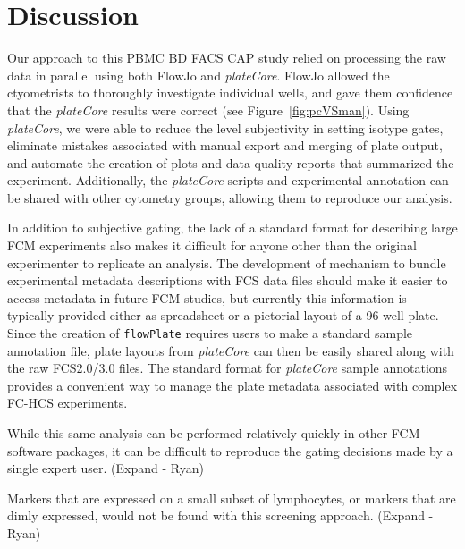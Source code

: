 \documentclass[12pt]{article}
\newcommand{\Robject}[1]{{\texttt{#1}}}
\newcommand{\Rpackage}[1]{{\textit{#1}}}
\begin{document}
\clearpage
\section*{Discussion}

Our approach to this PBMC BD FACS CAP study relied on processing the raw data
in parallel using both FlowJo and \Rpackage{plateCore}. FlowJo
allowed the ctyometrists to thoroughly investigate individual wells, and gave them confidence
that the \Rpackage{plateCore} results were correct (see Figure~\ref{fig:pcVSman}). Using
\Rpackage{plateCore}, we were able to reduce the level subjectivity in setting isotype gates,
eliminate mistakes associated with manual export and merging of plate output,
and automate the creation of plots and data quality reports that summarized the experiment. 
Additionally, the \Rpackage{plateCore} scripts and experimental annotation can
be shared with other cytometry groups, allowing them to reproduce our analysis. 

In addition to subjective gating, the lack of a standard format for describing large FCM experiments also
makes it difficult for anyone other than the original experimenter to replicate an analysis. %
The development of mechanism to bundle experimental metadata descriptions with FCS data files should make it easier to access metadata in future FCM studies, but currently
this information is typically provided either as spreadsheet or a pictorial layout of a 96 well plate. 
Since the creation of \Robject{flowPlate} requires users to make a standard sample annotation file, plate layouts from \Rpackage{plateCore}
can then be easily shared along with the raw FCS2.0/3.0 files. 
The standard format for \Rpackage{plateCore} sample annotations provides a convenient way to manage the plate metadata
associated with complex FC-HCS experiments.

While this same analysis can be performed relatively quickly in 
other FCM software packages, it can be difficult to reproduce the gating decisions made by a single expert user.
(Expand - Ryan)

Markers that are expressed on a small subset of lymphocytes, or markers that are dimly expressed,
would not be found with this screening approach. %
(Expand - Ryan)
\end{document}
